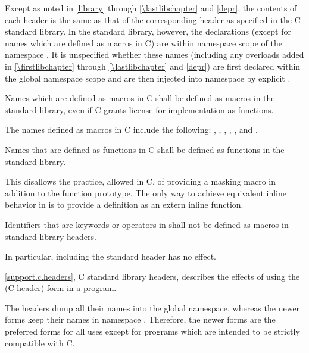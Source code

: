\pnum
Except as noted in \ref{library} through \ref{\lastlibchapter}
and \ref{depr}, the contents of each header  is
the same as that of the corresponding header  as
specified in the C standard library.
In the \Cpp{} standard library, however, the
declarations (except for names which are defined as macros in C) are within
namespace scope of the namespace .
It is unspecified whether these names (including any overloads added in
\ref{\firstlibchapter} through \ref{\lastlibchapter} and \ref{depr})
are first declared within the global namespace scope
and are then injected into namespace  by explicit
.

\pnum
Names which are defined as macros in C shall be defined as macros in the \Cpp{}
standard library, even if C grants license for implementation as functions.
\begin{note}
The names defined as macros in C include the following:
, , , ,
, and .
\end{note}

\pnum
Names that are defined as functions in C shall be defined as functions in the
\Cpp{} standard library.
\begin{footnote}
This disallows the practice, allowed in C, of
providing a masking macro in addition to the function prototype. The only way to
achieve equivalent inline behavior in \Cpp{} is to provide a definition as an
extern inline function.
\end{footnote}

\pnum
Identifiers that are keywords or operators in \Cpp{} shall not be defined as
macros in \Cpp{} standard library headers.
\begin{footnote}
In particular, including the
standard header  has no effect.
\end{footnote}

\pnum
\ref{support.c.headers}, C standard library headers, describes the effects of using
the  (C header) form in a \Cpp{} program.
\begin{footnote}
 The
 headers dump all their names into the global namespace, whereas the
newer forms keep their names in namespace . Therefore, the newer
forms are the preferred forms for all uses except for \Cpp{} programs which are
intended to be strictly compatible with C.
\end{footnote}

